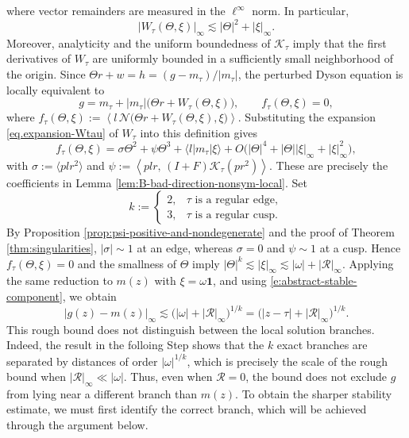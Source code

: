 \documentclass[11pt,twoside, a4paper]{article}
\numberwithin{equation}{section}
\numberwithin{figure}{section}
\theoremstyle{plain} %
\theoremstyle{definition}
\theoremstyle{remark}
\newcommand{\1} {\mspace{1 mu}}
\newcommand{\2} {\mspace{2 mu}}
\begin{document}
where vector remainders are measured in the \(\ell^\infty\) norm. In particular,
\begin{equation}
\label{e:abstract-stable-component}
|W_\tau(\Theta,\xi)|_\infty
\lesssim|\Theta|^2+|\xi|_\infty.
\end{equation}
Moreover, analyticity and the uniform boundedness of \(\mathcal K_\tau\) imply that the first derivatives of \(W_\tau\) are uniformly bounded in a sufficiently small neighborhood of the origin.
Since $\Theta r+w=h=(g-m_\tau)/|m_\tau|$, the perturbed Dyson equation is locally equivalent to
\begin{equation}
\label{e:abstract-exact-reduction}
g=m_\tau+|m_\tau|\bigl(\Theta r+W_\tau(\Theta,\xi)\bigr),
\qquad
f_\tau(\Theta,\xi)=0,
\end{equation}
where
$
f_\tau(\Theta,\xi)
:=
\left\langle
l\,\mathcal N\bigl(\Theta r+W_\tau(\Theta,\xi),\xi\bigr)
\right\rangle.
$
Substituting the expansion \eqref{eq.expansion-Wtau} of $W_\tau$ into this definition gives
\begin{equation}
\label{e:abstract-reduced-scalar-equation}
f_\tau(\Theta,\xi)
=
\sigma\Theta^2+\psi\Theta^3+\langle l|m_\tau|\xi\rangle
+
O\bigl(
|\Theta|^4+|\Theta||\xi|_\infty+|\xi|_\infty^2
\bigr),
\end{equation}
with
$
\sigma:=\langle plr^2\rangle
$
and
$
\psi:=
\left\langle
plr,\,(I+F)\mathcal K_\tau(pr^2)
\right\rangle.$
These are precisely the
coefficients in Lemma \ref{lem:B-bad-direction-nonsym-local}.
Set
\[
k:=
\begin{cases}
2,& \tau \text{ is a regular edge},\\
3,& \tau \text{ is a regular cusp}.
\end{cases}
\]
By Proposition \ref{prop:psi-positive-and-nondegenerate} and the proof of Theorem \ref{thm:singularities},
$|\sigma|\sim1$ at an edge, whereas $\sigma=0$ and $\psi\sim1$
at a cusp. Hence $f_\tau(\Theta,\xi)=0$ and the smallness of
$\Theta$ imply
$
|\Theta|^k\lesssim|\xi|_\infty
\lesssim|\omega|+|\mathcal R|_\infty.
$
Applying the same reduction to $m(z)$ with $\xi=\omega\mathbf1$,
and using \eqref{e:abstract-stable-component}, we obtain
\begin{equation}
\label{e:abstract-nonlinear-bound}
|g(z)-m(z)|_\infty
\lesssim
\bigl(|\omega|+|\mathcal R|_\infty\bigr)^{1/k}=\bigl(|z-\tau|+|\mathcal R|_\infty\bigr)^{1/k}.
\end{equation}
This rough bound does not distinguish between the local
solution branches. Indeed, the result in the folloing Step shows that the $k$ exact branches are
separated by distances of order $|\omega|^{1/k}$,
which is precisely the scale of the rough bound when
$|\mathcal R|_\infty\ll|\omega|$.
Thus, even when $\mathcal{R}=0$, the bound does not exclude
$g$ from lying near a different branch than $m(z)$.
To obtain the sharper stability estimate, we must
first identify the correct branch, which will be
achieved through the argument below.
\end{document}
